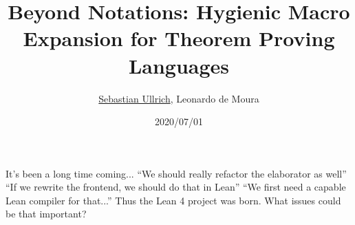 \documentclass[t]{beamer}
\title{Beyond Notations: Hygienic Macro Expansion for Theorem Proving Languages}
\author[Ullrich, de Moura]{\underline{Sebastian Ullrich}\inst{1}, Leonardo de Moura\inst{2}}
\subtitle{\insertauthor}
\institute[]{\inst{1}KIT, Germany\ \ \ \inst{2}Microsoft Research, USA}
\date{2020/07/01}
\begin{document}
\begin{frame}
  \maketitle
\end{frame}


\begin{frame}{It's been a long time coming...}
  \vfill
  \vfill
  \pause
  ``We should really refactor the elaborator as well''
  \vfill
  \pause
  ``If we rewrite the frontend, we should do that in Lean''
  \vfill
  \pause
  ``We first need a capable Lean compiler for that...''
  \vfill
  \pause
  Thus the Lean 4 project was born.
  \vfill
  \pause
  What issues could be that important?
\end{frame}
\end{document}
